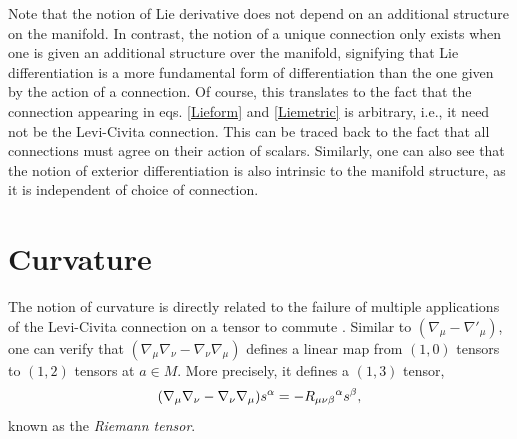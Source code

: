 \documentclass[
12pt,		%
openright,	%
twoside,  %
a4paper,			%
chapter=TITLE,		%
english,			%
french,				%
spanish,			%
brazil				%
]{USPSC-classe/USPSC}
\begin{document}
\begin{apendicesenv}
Note that the notion of Lie derivative does not depend on an additional structure on the manifold. In contrast, the notion of a unique connection only exists when one is given an additional structure over the manifold, signifying that Lie differentiation is a more fundamental form of differentiation than the one given by the action of a connection. Of course, this translates to the fact that the connection appearing in eqs. \ref{Lieform} and \ref{Liemetric} is arbitrary, i.e., it need not be the Levi-Civita connection. This can be traced back to the fact that all connections must agree on their action of scalars. Similarly, one can also see that the notion of exterior differentiation is also intrinsic to the manifold structure, as it is independent of choice of connection.

\section{Curvature}\label{A3}

The notion of curvature is directly related to the failure of multiple applications of the Levi-Civita connection on a tensor to commute \cite{Wald1984}. Similar to $(\nabla_{\mu}-\nabla'_{\mu})$, one can verify that $(\nabla_{\mu}\nabla_{\nu}-\nabla_{\nu}\nabla_{\mu})$ defines a linear map from $(1,0)$ tensors to $(1,2)$ tensors at $a\in M$. More precisely, it defines a $(1,3)$ tensor,
\begin{equation}\label{eqa20}
(\nabla_{\mu}\nabla_{\nu}-\nabla_{\nu}\nabla_{\mu})s^{\alpha}=-R_{\mu\nu\beta}\mathstrut^{\alpha}s^{\beta},
\end{equation}
known as the \textit{Riemann tensor}. 


\end{apendicesenv}
\end{document}
